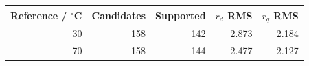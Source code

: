 \begin{tabular}{rrrrr}
\toprule
Reference / $^\circ$C & Candidates & Supported & $r_d$ RMS & $r_q$ RMS\\
\midrule
30 & 158 & 142 & 2.873 & 2.184 \\
70 & 158 & 144 & 2.477 & 2.127 \\
\bottomrule
\end{tabular}
